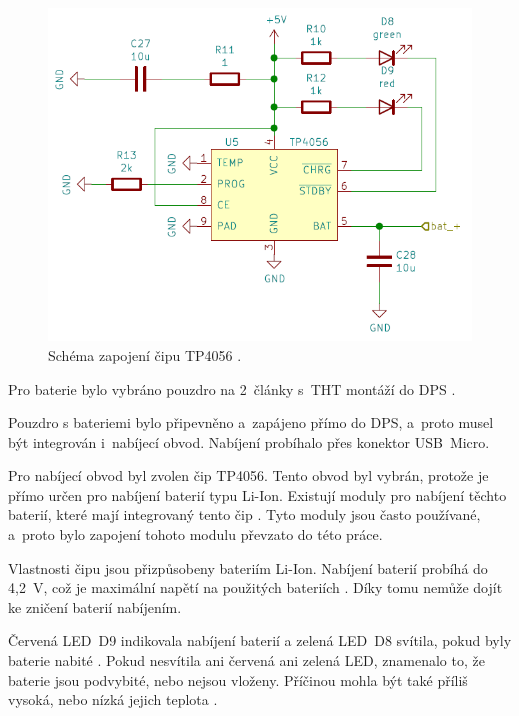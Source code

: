   \begin{figure}[!h]
    \begin{center}
      \includegraphics[scale=0.6]{obrazky/TP4056_schema.png}
    \end{center}
    \caption[Schéma zapojení čipu TP4056 \cite{TP4056_datasheet}]{Schéma zapojení čipu TP4056 \cite{TP4056_datasheet}.}
  \end{figure}

  Pro baterie bylo vybráno pouzdro na 2~články s~THT montáží do DPS \cite{18650_pouzdro}.

  Pouzdro s bateriemi bylo připevněno a~zapájeno přímo do DPS, a~proto musel být integrován i~nabíjecí obvod. Nabíjení probíhalo přes konektor 
  USB~Micro.

  Pro nabíjecí obvod byl zvolen čip TP4056. Tento obvod byl vybrán, protože je přímo určen pro nabíjení baterií typu Li-Ion. Existují 
  moduly pro nabíjení těchto baterií, které mají integrovaný tento čip \cite{Nabijeci_modul}. Tyto moduly jsou často používané, a~proto 
  bylo zapojení tohoto modulu převzato do této práce. 

  Vlastnosti čipu jsou přizpůsobeny bateriím Li-Ion. Nabíjení baterií probíhá do 4,2~V, což je maximální napětí na použitých 
  bateriích \cite{18650} \cite{TP4056_datasheet}. Díky tomu nemůže dojít ke zničení baterií nabíjením.

  Červená LED~D9 indikovala nabíjení baterií a  zelená LED~D8 svítila, pokud byly baterie nabité \cite{TP4056_datasheet}. 
  Pokud nesvítila ani červená ani zelená LED, znamenalo to, že baterie jsou podvybité, nebo nejsou vloženy. Příčinou mohla být také příliš vysoká, 
  nebo nízká jejich teplota \cite{TP4056_datasheet}.

